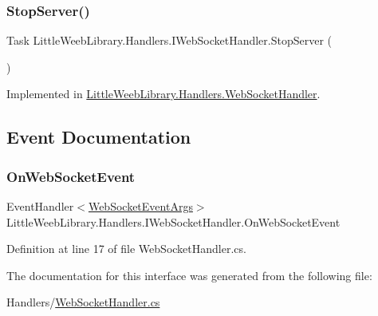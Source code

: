 \subsubsection{\texorpdfstring{Stop\+Server()}{StopServer()}}
{\footnotesize\ttfamily Task Little\+Weeb\+Library.\+Handlers.\+I\+Web\+Socket\+Handler.\+Stop\+Server (\begin{DoxyParamCaption}{ }\end{DoxyParamCaption})}



Implemented in \mbox{\hyperlink{class_little_weeb_library_1_1_handlers_1_1_web_socket_handler_abcd87ac26780369b500299fc12aa0039}{Little\+Weeb\+Library.\+Handlers.\+Web\+Socket\+Handler}}.



\subsection{Event Documentation}
\mbox{\label{interface_little_weeb_library_1_1_handlers_1_1_i_web_socket_handler_a97a64552bc41c6a11c65ec489f833d8c}} 
\subsubsection{\texorpdfstring{On\+Web\+Socket\+Event}{OnWebSocketEvent}}
{\footnotesize\ttfamily Event\+Handler$<$\mbox{\hyperlink{class_little_weeb_library_1_1_event_arguments_1_1_web_socket_event_args}{Web\+Socket\+Event\+Args}}$>$ Little\+Weeb\+Library.\+Handlers.\+I\+Web\+Socket\+Handler.\+On\+Web\+Socket\+Event}



Definition at line 17 of file Web\+Socket\+Handler.\+cs.



The documentation for this interface was generated from the following file\+:\begin{DoxyCompactItemize}
\item 
Handlers/\mbox{\hyperlink{_web_socket_handler_8cs}{Web\+Socket\+Handler.\+cs}}\end{DoxyCompactItemize}
